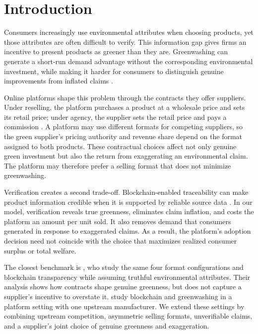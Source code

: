 \documentclass[preprint,review,12pt,authoryear,nopreprintline]{elsarticle}
\theoremstyle{definition}
\begin{document}
\section{Introduction}\label{sec:1}

Consumers increasingly use environmental attributes when choosing products, yet those attributes are often difficult to verify. This information gap gives firms an incentive to present products as greener than they are. Greenwashing can generate a short-run demand advantage without the corresponding environmental investment, while making it harder for consumers to distinguish genuine improvements from inflated claims \citep{huang2020coml,wang2025go,chen2023impact}.

Online platforms shape this problem through the contracts they offer suppliers. Under reselling, the platform purchases a product at a wholesale price and sets its retail price; under agency, the supplier sets the retail price and pays a commission \citep{Abhishek2016,tian2018mark}. A platform may use different formats for competing suppliers, so the green supplier's pricing authority and revenue share depend on the format assigned to both products. These contractual choices affect not only genuine green investment but also the return from exaggerating an environmental claim. The platform may therefore prefer a selling format that does not minimize greenwashing.

Verification creates a second trade-off. Blockchain-enabled traceability can make product information credible when it is supported by reliable source data \citep{cao2022adopt,shen2022combat,wu2024blockchain}. In our model, verification reveals true greenness, eliminates claim inflation, and costs the platform an amount per unit sold. It also removes demand that consumers generated in response to exaggerated claims. As a result, the platform's adoption decision need not coincide with the choice that maximizes realized consumer surplus or total welfare.

The closest benchmark is \citet{wu2025platform}, who study the same four format configurations and blockchain transparency while assuming truthful environmental attributes. Their analysis shows how contracts shape genuine greenness, but does not capture a supplier's incentive to overstate it. \citet{xu2025should} study blockchain and greenwashing in a platform setting with one upstream manufacturer. We extend these settings by combining upstream competition, asymmetric selling formats, unverifiable claims, and a supplier's joint choice of genuine greenness and exaggeration.
\end{document}
